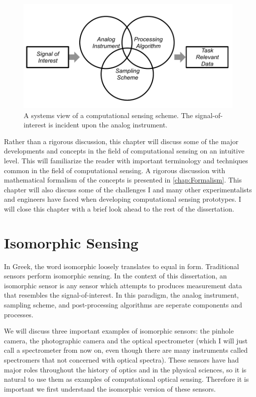 \begin{figure}
    \centering
    \includegraphics[scale=1]{computationalsensingflowchart}
    \caption{A systems view of a computational sensing scheme. The signal-of-interest is incident upon the analog instrument.  }
    \label{fig:computationalsensingflowchart}
\end{figure}


Rather than a rigorous discussion, this chapter will discuss some of the major developments and concepts in the field of computational sensing on an intuitive level. This will familiarize the reader with important terminology and techniques common in the field of computational sensing. A rigorous discussion with mathematical formalism of the concepts is presented in \autoref{chap:Formalism}. This chapter will also discuss some of the challenges I and many other experimentalists and engineers have faced when developing computational sensing prototypes. I will close this chapter with a brief look ahead to the rest of the dissertation. 


\section{Isomorphic Sensing}\label{sec:Isomorphic Sensing}

In Greek, the word isomorphic loosely translates to equal in form. Traditional sensors perform isomorphic sensing. In the context of this dissertation, an isomorphic sensor is any sensor which attempts to produces measurement data that resembles the signal-of-interest. In this paradigm, the analog instrument, sampling scheme, and post-processing algorithms are seperate components and processes.

We will discuss three important examples of isomorphic sensors: the pinhole camera, the photographic camera and the optical spectrometer (which I will just call a spectrometer from now on, even though there are many instruments called spectromers that not concerned with optical spectra). These sensors have had major roles throughout the history of optics and in the physical sciences, so it is natural to use them as examples of computational optical sensing. Therefore it is important we first understand the isomorphic version of these sensors.

